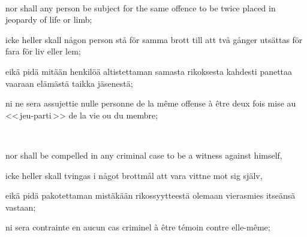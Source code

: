\documentclass[a4paper,landscape,12pt]{article}
\begin{document}
~

\begin{minipage}[t]{0.22\textwidth}
nor shall any person be subject for the same offence to be twice placed in jeopardy of life or limb;
\end{minipage}\textwidth
\begin{minipage}[t]{0.22\textwidth}
icke heller skall någon person stå för samma brott till att två gånger utsättas för fara för liv eller lem;
\end{minipage}\textwidth
\begin{minipage}[t]{0.22\textwidth}
eikä pidä mitään henkilöä altistettaman samasta rikoksesta kahdesti panettaa vaaraan elämästä taikka jäsenestä;
\end{minipage}\textwidth
\begin{minipage}[t]{0.22\textwidth}
ni ne sera assujettie nulle personne de la même offense à être deux fois mise au <<\,jeu-parti\,>> de la vie ou du membre;
\end{minipage}

~

\begin{minipage}[t]{0.22\textwidth}
nor shall be compelled in any criminal case to be a witness against himself,
\end{minipage}\textwidth
\begin{minipage}[t]{0.22\textwidth}
 icke heller skall tvingas i något brottmål att vara vittne mot sig själv, 
\end{minipage}\textwidth
\begin{minipage}[t]{0.22\textwidth}
 eikä pidä pakotettaman mistäkään rikossyytteestä olemaan vierasmies itseänsä vastaan;
\end{minipage}\textwidth
\begin{minipage}[t]{0.22\textwidth}
ni sera contrainte en aucun cas criminel à être témoin contre elle-même;
\end{minipage}

~
\end{document}
